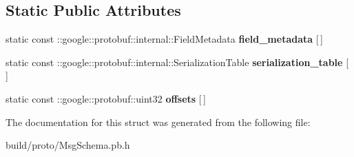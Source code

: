 \subsection*{Static Public Attributes}
\begin{DoxyCompactItemize}
\item 
\mbox{\label{structTableStruct__MsgSchema__2eproto_a286cf9547bc3afe449eb0ebae18a8489}} 
static const \+::google\+::protobuf\+::internal\+::\+Field\+Metadata {\bfseries field\+\_\+metadata} \mbox{[}$\,$\mbox{]}
\item 
\mbox{\label{structTableStruct__MsgSchema__2eproto_a9ae73a30fce925957293eaa7d6332065}} 
static const \+::google\+::protobuf\+::internal\+::\+Serialization\+Table {\bfseries serialization\+\_\+table} \mbox{[}$\,$\mbox{]}
\item 
\mbox{\label{structTableStruct__MsgSchema__2eproto_a9dcec084a54bde0488e3692c5f721b77}} 
static const \+::google\+::protobuf\+::uint32 {\bfseries offsets} \mbox{[}$\,$\mbox{]}
\end{DoxyCompactItemize}


The documentation for this struct was generated from the following file\+:\begin{DoxyCompactItemize}
\item 
build/proto/Msg\+Schema.\+pb.\+h\end{DoxyCompactItemize}
